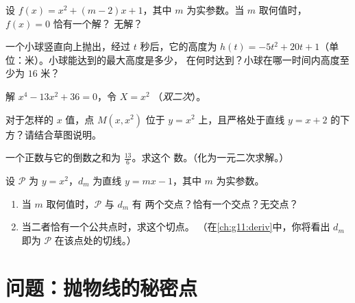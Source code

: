 \begin{exercise}[$\star\star$]\label{exo:g11:quad:6}
设 $f(x) = x^2 + (m-2)x + 1$，其中 $m$ 为实参数。当
$m$ 取何值时， $f(x) = 0$ 恰有一个解？
无解？
\end{exercise}

\begin{exercise}[$\star\star$]\label{exo:g11:quad:7}
一个小球竖直向上抛出，经过 $t$ 秒后，它的高度为
$h(t) = -5t^2 + 20t + 1$（单位：米）。小球能达到的最大高度是多少，
在何时达到？小球在哪一时间内高度至少为
$16$ 米？
\end{exercise}

\begin{exercise}[$\star\star$]\label{exo:g11:quad:8}
解 $x^4 - 13x^2 + 36 = 0$，令 $X = x^2$
（\emph{双二次}）。
\end{exercise}

\begin{exercise}[$\star\star$]\label{exo:g11:quad:9}
对于怎样的 $x$ 值，点 $M(x, x^2)$ 位于 $y = x^2$
上，且严格处于直线 $y = x + 2$ 的下方？请结合草图说明。
\end{exercise}

\begin{exercise}[$\star\star$]\label{exo:g11:quad:10}
一个正数与它的倒数之和为 $\frac{13}{6}$。求这个
数。（化为一元二次求解。）
\end{exercise}

\begin{exercise}[$\star\star\star$]\label{exo:g11:quad:11}
设 $\mathcal P$ 为 $y = x^2$，$d_m$ 为直线
$y = mx - 1$，其中 $m$ 为实参数。
\begin{enumerate}
  \item 当 $m$ 取何值时，$\mathcal P$ 与 $d_m$ 有
        两个交点？恰有一个交点？无交点？
  \item 当二者恰有一个公共点时，求这个切点。
        （在\cref{ch:g11:deriv}中，你将看出 $d_m$ 即为
        $\mathcal P$ 在该点处的切线。）
\end{enumerate}
\end{exercise}

\section{问题：抛物线的秘密点}

